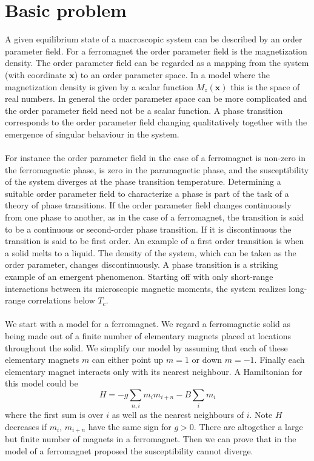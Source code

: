 \section{Basic problem}
A given equilibrium state of a macroscopic system can be described by an order parameter field. For a ferromagnet the order parameter field is the magnetization density. 
The order parameter field can be regarded as a mapping from the system (with coordinate $\bm{x}$) to an order parameter space. In a model where the magnetization density is given by a scalar function $M_z(\bm{x})$ this is the space of real numbers. In general the order parameter space can be more complicated and the order parameter field need not be a scalar function.
A phase transition corresponds to the order parameter field
changing qualitatively together with the emergence of singular behaviour in the system.
\\ \\
For instance the order parameter field in the case of a ferromagnet is non-zero in the ferromagnetic phase, is zero in the paramagnetic phase, and the susceptibility of the system diverges at the phase transition temperature. 
Determining a suitable order parameter field to characterize a phase is part of the task of a theory of phase transitions. If the order parameter field changes continuously from one phase to another, as in the case of a ferromagnet, the transition is said to be a continuous or second-order phase transition. If it is discontinuous the transition is said to be first order. 
An example of a first order transition is when a solid melts
to a liquid. The density of the system, which can be taken as the order parameter, changes discontinuously. A phase transition is a striking example of an emergent phenomenon. Starting off with only short-range interactions between its microscopic magnetic moments, the system realizes long-range correlations below $T_c$.
\\ \\
We start with a model for a ferromagnet. We regard a ferromagnetic solid as being made out of a finite number of elementary magnets placed at locations throughout the solid.
We simplify our model by assuming that each of these elementary magnets $m$ can either point up $m = 1$ or down $m = -1$. Finally each elementary magnet interacts only with its nearest neighbour. A Hamiltonian for this model could be
\[H = -g\sum_{n,i}m_im_{i+n} - B\sum_i m_i\]
where the first sum is over $i$ as well as the nearest neighbours of $i$. Note $H$ decreases if $m_i$, $m_{i+n}$ have the same sign for $g > 0$. There are altogether a large but finite number of magnets in a ferromagnet. Then we can prove that in the model of a ferromagnet proposed the susceptibility cannot diverge. 
